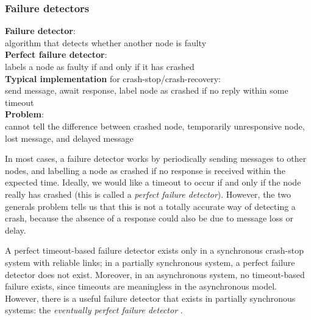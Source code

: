 \begin{frame}
    \label{s:failure-detector}
    \frametitle{Failure detectors}
    \textbf{Failure detector}:\\algorithm that detects whether another node is faulty\\[1em]
    \textbf{Perfect failure detector}:\\labels a node as faulty if and only if it has crashed\\[1em]\pause
    \textbf{Typical implementation} for crash-stop/crash-recovery:\\
    send message, await response, label node as crashed if no reply within some timeout\\[1em]\pause
    \textbf{Problem}:\\cannot tell the difference between crashed node, temporarily
    unresponsive node, lost message, and delayed message\\[1em]
\end{frame}
\label{l:failure-detector}

In most cases, a failure detector works by periodically sending messages to other nodes, and labelling a node as crashed if no response is received within the expected time.
Ideally, we would like a timeout to occur if and only if the node really has crashed (this is called a \emph{perfect failure detector}).
However, the two generals problem tells us that this is not a totally accurate way of detecting a crash, because the absence of a response could also be due to message loss or delay.

A perfect timeout-based failure detector exists only in a synchronous crash-stop system with reliable links; in a partially synchronous system, a perfect failure detector does not exist.
Moreover, in an asynchronous system, no timeout-based failure exists, since timeouts are meaningless in the asynchronous model.
However, there is a useful failure detector that exists in partially synchronous systems: the \emph{eventually perfect failure detector} \citep{Chandra:1996}.

